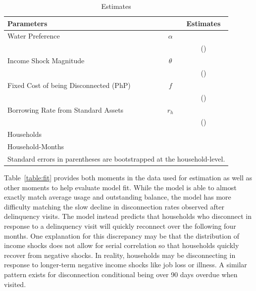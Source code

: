 \documentclass[12pt]{article}
\begin{document}
\begin{table}[h!]
\centering
\caption{Estimates}\label{table:estimates}
\vspace{-2mm}
\begin{tabular}{l*{1}{cc}}
\toprule
Parameters  &   & Estimates \\
\midrule
Water Preference & $\alpha$ &  \\
 &  & (\unskip) \\[.4em]
Income Shock Magnitude & $\theta$ &  \\
 &  & (\unskip) \\[.4em]
Fixed Cost of being Disconnected (PhP) & $f$ &   \\
 &  &  (\unskip) \\[.4em]
Borrowing Rate from Standard Assets & $r_h$ &  \\
 &  & (\unskip) \\[.8em]
Households & &  \\
Household-Months & &  \\
\bottomrule
\multicolumn{3}{l}{\scriptsize Standard errors in parentheses are bootstrapped at the household-level.} %
\end{tabular}
\end{table}

Table~\ref{table:fit} provides both moments in the data used for estimation as well as other moments to help evaluate model fit.  While the model is able to almost exactly match average usage and outstanding balance, the model has more difficulty matching the slow decline in disconnection rates observed after delinquency visits.  The model instead predicts that households who disconnect in response to a delinquency visit will quickly reconnect over the following four months.  One explanation for this discrepancy may be that the distribution of income shocks does not allow for serial correlation so that households quickly recover from negative shocks.  In reality, households may be disconnecting in response to longer-term negative income shocks like job loss or illness.  A similar pattern exists for disconnection conditional being over 90 days overdue when visited.
\end{document}
